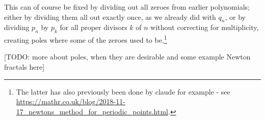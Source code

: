 \documentclass[12pt,a4paper]{article}
\begin{document}
This can of course be fixed by dividing out all zeroes from earlier polynomials; either by dividing them all out exactly once, as we already did with $q_n$, or by dividing $p_n$ by $p_k$ for all proper divisors $k$ of $n$ without correcting for multiplicity, creating poles where some of the zeroes used to be.\footnote{The latter has also previously been done by claude for example - see \url{https://mathr.co.uk/blog/2018-11-17_newtons_method_for_periodic_points.html}.}

[TODO: more about poles, when they are desirable and some example Newton fractals here]


\end{document}
